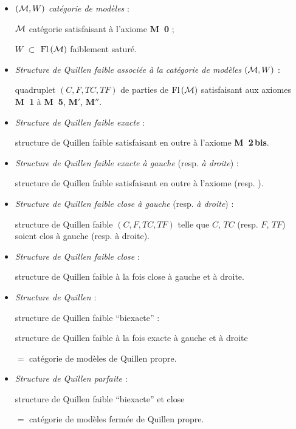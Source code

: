 \begin{itemize}
\item[\textbullet] $(\mathcal{M},W)$ \textit{catégorie de modèles} :

$\mathcal{M}$ catégorie satisfaisant à l'axiome \textbf{M~0} ;

$W$ $\subset$ $\mathrm{Fl}\,(\mathcal{M})$ faiblement saturé.

\item[\textbullet] \textit{Structure de Quillen faible associée à la catégorie de modèles} $(\mathcal{M},W)$ :

quadruplet $(C,F,TC,TF)$ de parties de $\mathrm{Fl}\,(\mathcal{M})$ satisfaisant aux axiomes \textbf{M~1} à \textbf{M~5}, $\mathbf{M}'$, $\mathbf{M}''$.

\item[\textbullet] \textit{Structure de Quillen faible exacte} :

structure de Quillen faible satisfaisant en outre à l'axiome \textbf{M~2\,bis}.

\item[\textbullet] \textit{Structure de Quillen faible exacte à gauche} (resp. \textit{à droite}) :

structure de Quillen faible satisfaisant en outre à l'axiome \Mzg{} (resp. \Mzd).
\end{itemize}


\begin{itemize}
\item[\textbullet] \textit{Structure de Quillen faible close à gauche} (resp. \textit{à droite}) :

structure de Quillen faible $(C,F,TC,TF)$ telle que $C$, $TC$ (resp. $F$, $TF$) soient clos à gauche (resp. à droite).

\item[\textbullet] \textit{Structure de Quillen faible close} :

structure de Quillen faible à la fois close à gauche et à droite.

\item[\textbullet] \textit{Structure de Quillen} :

structure de Quillen faible “biexacte” :

structure de Quillen faible à la fois exacte à gauche et à droite

$=$ catégorie de modèles de Quillen propre.

\item[\textbullet] \textit{Structure de Quillen parfaite} :

structure de Quillen faible “biexacte” et close

$=$ catégorie de modèles fermée de Quillen propre.
\end{itemize}


